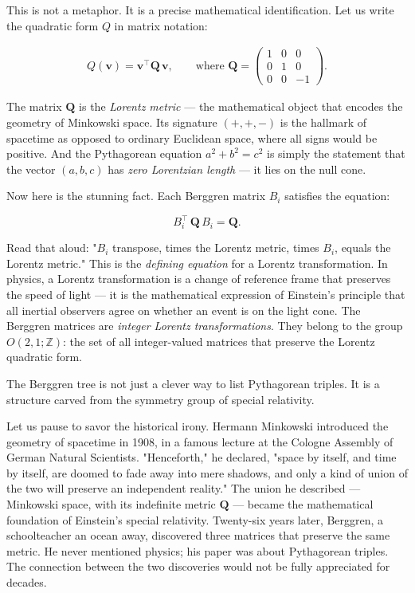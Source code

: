 \documentclass[11pt,twoside,openright]{book}
\theoremstyle{definition}
\theoremstyle{remark}
\begin{document}
This is not a metaphor. It is a precise mathematical identification. Let us write the quadratic form $Q$ in matrix notation:

\begin{align*}
Q(\mathbf{v}) = \mathbf{v}^\top \mathbf{Q} \, \mathbf{v}, \qquad \text{where } \mathbf{Q} = \begin{pmatrix} 1 & 0 & 0 \\ 0 & 1 & 0 \\ 0 & 0 & -1 \end{pmatrix}.
\end{align*}

The matrix $\mathbf{Q}$ is the \textit{Lorentz metric} --- the mathematical object that encodes the geometry of Minkowski space. Its signature $(+, +, -)$ is the hallmark of spacetime as opposed to ordinary Euclidean space, where all signs would be positive. And the Pythagorean equation $a^2 + b^2 = c^2$ is simply the statement that the vector $(a, b, c)$ has \textit{zero Lorentzian length} --- it lies on the null cone.

Now here is the stunning fact. Each Berggren matrix $B_i$ satisfies the equation:

\[B_i^\top \, \mathbf{Q} \, B_i = \mathbf{Q}.\]

Read that aloud: "$B_i$ transpose, times the Lorentz metric, times $B_i$, equals the Lorentz metric." This is the \textit{defining equation} for a Lorentz transformation. In physics, a Lorentz transformation is a change of reference frame that preserves the speed of light --- it is the mathematical expression of Einstein's principle that all inertial observers agree on whether an event is on the light cone. The Berggren matrices are \textit{integer Lorentz transformations}. They belong to the group $O(2, 1; \mathbb{Z})$: the set of all integer-valued matrices that preserve the Lorentz quadratic form.

The Berggren tree is not just a clever way to list Pythagorean triples. It is a structure carved from the symmetry group of special relativity.


Let us pause to savor the historical irony. Hermann Minkowski introduced the geometry of spacetime in 1908, in a famous lecture at the Cologne Assembly of German Natural Scientists. "Henceforth," he declared, "space by itself, and time by itself, are doomed to fade away into mere shadows, and only a kind of union of the two will preserve an independent reality." The union he described --- Minkowski space, with its indefinite metric $\mathbf{Q}$ --- became the mathematical foundation of Einstein's special relativity. Twenty-six years later, Berggren, a schoolteacher an ocean away, discovered three matrices that preserve the same metric. He never mentioned physics; his paper was about Pythagorean triples. The connection between the two discoveries would not be fully appreciated for decades.
\end{document}
